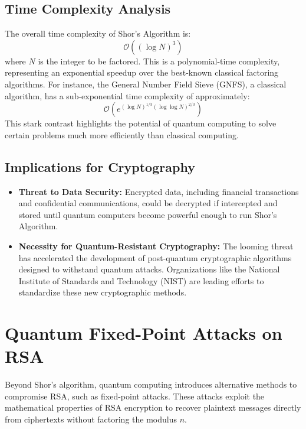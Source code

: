 \documentclass{article}
\begin{document}



\subsection{Time Complexity Analysis}

The overall time complexity of Shor's Algorithm is:
\[
    \mathcal{O}((\log N)^3)
\]
where $N$ is the integer to be factored. This is a polynomial-time complexity, representing an exponential speedup over the best-known classical factoring algorithms. For instance, the General Number Field Sieve (GNFS), a classical algorithm, has a sub-exponential time complexity of approximately:
\[
    \mathcal{O}\left(e^{(\log N)^{1/3} (\log \log N)^{2/3}}\right)
\]
This stark contrast highlights the potential of quantum computing to solve certain problems much more efficiently than classical computing.

\subsection{Implications for Cryptography}

\begin{itemize}
    \item \textbf{Threat to Data Security:} Encrypted data, including financial transactions and confidential communications, could be decrypted if intercepted and stored until quantum computers become powerful enough to run Shor's Algorithm.
    \item \textbf{Necessity for Quantum-Resistant Cryptography:} The looming threat has accelerated the development of post-quantum cryptographic algorithms designed to withstand quantum attacks. Organizations like the National Institute of Standards and Technology (NIST) are leading efforts to standardize these new cryptographic methods.
\end{itemize}

\section{Quantum Fixed-Point Attacks on RSA}

Beyond Shor's algorithm, quantum computing introduces alternative methods to compromise RSA, such as fixed-point attacks. These attacks exploit the mathematical properties of RSA encryption to recover plaintext messages directly from ciphertexts without factoring the modulus \( n \).
\end{document}
